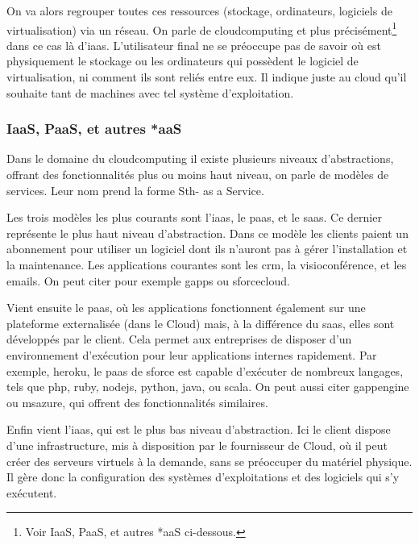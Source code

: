 \documentclass[a4paper,oneside]{report}
\begin{document}
On va alors regrouper toutes ces ressources (stockage, ordinateurs, logiciels de \gls{virtualisation}) via un réseau.
On parle de \gls{cloudcomputing} et plus précisément\footnote{Voir \og IaaS, PaaS, et autres *aaS \fg ci-dessous.} dans ce cas là d’\gls{iaas}.
L'utilisateur final ne se préoccupe pas de savoir où est physiquement le stockage ou les ordinateurs qui possèdent le logiciel de \gls{virtualisation}, ni comment ils sont reliés entre eux. Il indique juste au cloud qu’il souhaite tant de machines avec tel système d'exploitation.

\subsubsection{IaaS, PaaS, et autres *aaS}
Dans le domaine du \gls{cloudcomputing} il existe plusieurs niveaux d’abstractions, offrant des fonctionnalités plus ou moins haut niveau, on parle de modèles de services.
Leur nom prend la forme Sth- as a Service.

Les trois modèles les plus courants sont l'\gls{iaas}, le \gls{paas}, et le \gls{saas}.
Ce dernier représente le plus haut niveau d'abstraction.\newline
Dans ce modèle les clients paient un abonnement pour utiliser un logiciel dont ils n'auront pas à gérer l'installation et la maintenance.
Les applications courantes sont les \gls{crm}, la visioconférence, et les emails.
On peut citer pour exemple \gls{gapps} ou \gls{sforcecloud}.

Vient ensuite le \gls{paas}, où les applications fonctionnent également sur une plateforme externalisée (dans le Cloud) mais, à la différence du \gls{saas}, elles sont développés par le client.\newline
Cela permet aux entreprises de disposer d'un environnement d'exécution pour leur applications internes rapidement.
Par exemple, \gls{heroku}, le \gls{paas} de \gls{sforce} est capable d'exécuter de nombreux langages, tels que \gls{php}, \gls{ruby}, \gls{nodejs}, \gls{python}, \gls{java}, ou \gls{scala}.
On peut aussi citer \gls{gappengine} ou \gls{msazure}, qui offrent des fonctionnalités similaires.

Enfin vient l'\gls{iaas}, qui est le plus bas niveau d'abstraction. 
Ici le client dispose d'une infrastructure, mis à disposition par le fournisseur de Cloud, où il peut créer des serveurs virtuels à la demande, sans se préoccuper du matériel physique.
Il gère donc la configuration des systèmes d'exploitations et des logiciels qui s'y exécutent.
\end{document}
